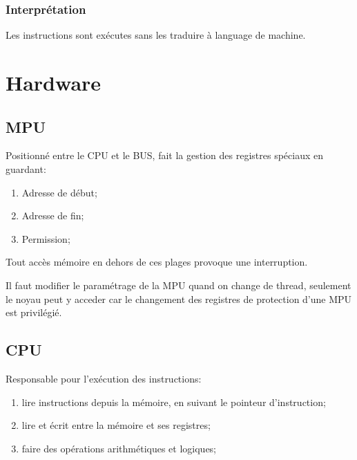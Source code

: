 \documentclass{article}
\begin{document}
\subsubsection{Interprétation}
\begin{definition}
    Les instructions sont exécutes sans les traduire à language de machine.
\end{definition}



\section{Hardware}
\subsection{MPU}
\begin{definition}\label{def:MPU}
    Positionné entre le CPU et le BUS, fait la gestion des registres spéciaux en guardant:
    \begin{enumerate}[noitemsep]
        \item Adresse de début;
        \item Adresse de fin;
        \item Permission;
    \end{enumerate}
    Tout accès mémoire en dehors de ces plages provoque une interruption.

    \begin{remark}
        Il faut modifier le paramétrage de la MPU quand on change de thread, seulement le noyau peut y acceder car le changement des registres de protection d'une MPU est privilégié.
    \end{remark}
\end{definition}


\subsection{CPU}
\begin{definition}\label{def:CPU}
    Responsable pour l'exécution des instructions:
    \begin{enumerate}[noitemsep]
        \item lire instructions depuis la mémoire, en suivant le pointeur d'instruction;
        \item lire et écrit entre la mémoire et ses registres;
        \item faire des opérations arithmétiques et logiques;
    \end{enumerate}
\end{definition}
\end{document}

